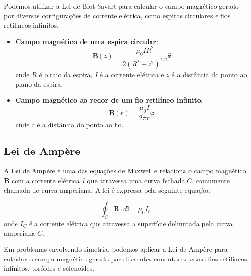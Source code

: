 \documentclass{article}
\begin{document}
Podemos utilizar a Lei de Biot-Savart para calcular o campo magnético gerado por diversas configurações de corrente elétrica, como espiras circulares e fios retilíneos infinitos.

\begin{itemize}
    \item [(a)] \textbf{Campo magnético de uma espira circular}:
        \begin{equation}
            \boxed{\mathbf{B}(z) = \frac{\mu_0 I R^2}{2(R^2 + z^2)^{3/2}} \hat{\mathbf{z}}}
        \end{equation} onde \(R\) é o raio da espira, \(I\) é a corrente elétrica e \(z\) é a distância do ponto ao plano da espira.
    \item [(b)] \textbf{Campo magnético ao redor de um fio retilíneo infinito}:
        \begin{equation}
            \boxed{\mathbf{B}(r) = \frac{\mu_0 I}{2\pi r}\hat{\boldsymbol{\varphi}}}
        \end{equation} onde \(r\) é a distância do ponto ao fio.
\end{itemize}

\subsection{Lei de Ampère}

A Lei de Ampère é uma das equações de Maxwell e relaciona o campo magnético \(\mathbf{B}\) com a corrente elétrica \(I\) que atravessa uma curva fechada \(C\), comumente chamada de curva amperiana. A lei é expressa pela seguinte equação:

\begin{equation}
    \boxed{\oint_{C} \mathbf{B} \cdot d\mathbf{l} = \mu_0 I_{C}}
\end{equation} onde \(I_{C}\) é a corrente elétrica que atravessa a superfície delimitada pela curva amperiana \(C\).

Em problemas envolvendo simetria, podemos aplicar a Lei de Ampère para calcular o campo magnético gerado por diferentes condutores, como fios retilíneos infinitos, toróides e solenoides.
\end{document}
